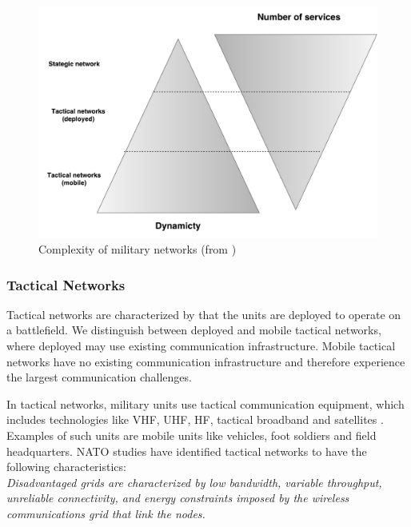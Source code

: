 \begin{figure}[h]
\includegraphics[scale=0.4, left]{images/Network_Complexity.pdf}
\caption{Complexity of military networks (from \cite{pervasive-web})}
\label{figure:military-networks}
\end{figure}

\subsubsection{Tactical Networks}

Tactical networks are characterized by that the units are deployed to operate on
a battlefield. We distinguish between deployed and mobile tactical networks,
where deployed may use existing communication infrastructure. Mobile tactical
networks have no existing communication infrastructure and therefore experience
the largest communication challenges.

 In tactical networks, military units use tactical communication equipment, which
 includes technologies like VHF, UHF, HF, tactical broadband and satellites
 \cite{ist-090}. Examples of such units are mobile units like vehicles, foot
 soldiers and field headquarters. NATO studies\cite{nato-disadvantaged-grids}
 have identified tactical networks to have the following characteristics: \\

\textit{
Disadvantaged grids are characterized by low bandwidth, variable throughput,
unreliable connectivity, and energy constraints imposed by the wireless
communications grid that link the nodes.
}

\paragraph{}

